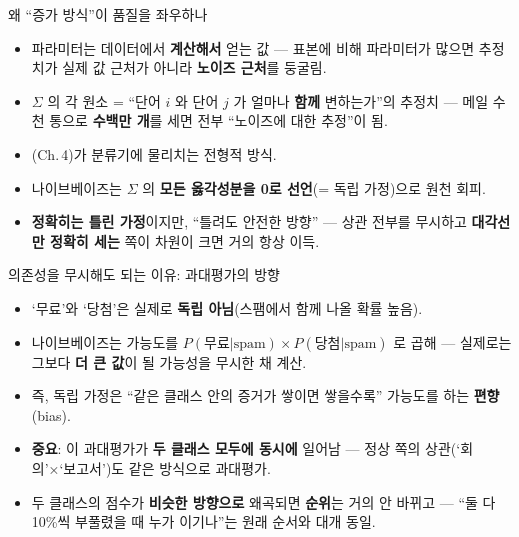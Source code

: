 \documentclass[aspectratio=169,11pt]{beamer}
\begin{document}
\begin{frame}{왜 ``증가 방식''이 품질을 좌우하나}
  \begin{itemize}
    \item 파라미터는 데이터에서 \textbf{계산해서} 얻는 값 ---
      표본에 비해 파라미터가 많으면 추정치가 실제 값 근처가 아니라
      \textbf{노이즈 근처}를 둥굴림.
    \item $\Sigma$ 의 각 원소 = ``단어 $i$ 와 단어 $j$ 가 얼마나
      \textbf{함께} 변하는가''의 추정치 --- 메일 수천 통으로
      \textbf{수백만 개}를 세면 전부 ``노이즈에 대한 추정''이 됨.
    \item {}(Ch.\,4)가 분류기에 물리치는 전형적 방식.
    \item 나이브베이즈는 $\Sigma$ 의 \textbf{모든 옳각성분을 0로
      선언}(= 독립 가정)으로 원천 회피.
    \item \textbf{정확히는 틀린 가정}이지만, ``틀려도 안전한 방향''
      --- 상관 전부를 무시하고 \textbf{대각선만 정확히 세는} 쪽이
      차원이 크면 거의 항상 이득.
  \end{itemize}
\end{frame}

\begin{frame}{의존성을 무시해도 되는 이유: 과대평가의 방향}
  \begin{itemize}
    \item `무료'와 `당첨'은 실제로 \textbf{독립 아님}(스팸에서 함께
      나올 확률 높음).
    \item 나이브베이즈는 가능도를
      $P(\text{무료}|\text{spam})\times P(\text{당첨}|\text{spam})$
      로 곱해 --- 실제로는 그보다 \textbf{더 큰 값}이 될 가능성을
      무시한 채 계산.
    \item 즉, 독립 가정은 ``같은 클래스 안의 증거가 쌓이면 쌓을수록''
      가능도를 하는 \textbf{편향}(bias).
    \item \textbf{중요}: 이 과대평가가 \textbf{두 클래스 모두에
      동시에} 일어남 --- 정상 쪽의 상관(`회의'×`보고서')도 같은
      방식으로 과대평가.
    \item 두 클래스의 점수가 \textbf{비슷한 방향으로} 왜곡되면
      \textbf{순위}는 거의 안 바뀌고 --- ``둘 다 10\%씩 부풀렸을 때
      누가 이기나''는 원래 순서와 대개 동일.
  \end{itemize}
\end{frame}
\end{document}

